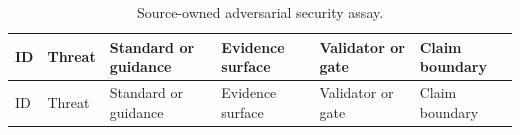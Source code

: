 \documentclass[
  english,
]{article}
\begin{document}
\begin{longtable}[]{@{}
  >{\raggedright\arraybackslash}p{}
  >{\raggedright\arraybackslash}p{}
  >{\raggedright\arraybackslash}p{}
  >{\raggedright\arraybackslash}p{}
  >{\raggedright\arraybackslash}p{}
  >{\raggedright\arraybackslash}p{}@{}}
\caption{Source-owned adversarial security
assay.}\label{tbl:security_assay}\tabularnewline
\toprule\noalign{}
\begin{minipage}[b]{\linewidth}\raggedright
ID
\end{minipage} & \begin{minipage}[b]{\linewidth}\raggedright
Threat
\end{minipage} & \begin{minipage}[b]{\linewidth}\raggedright
Standard or guidance
\end{minipage} & \begin{minipage}[b]{\linewidth}\raggedright
Evidence surface
\end{minipage} & \begin{minipage}[b]{\linewidth}\raggedright
Validator or gate
\end{minipage} & \begin{minipage}[b]{\linewidth}\raggedright
Claim boundary
\end{minipage} \\
\midrule\noalign{}
\endfirsthead
\toprule\noalign{}
\begin{minipage}[b]{\linewidth}\raggedright
ID
\end{minipage} & \begin{minipage}[b]{\linewidth}\raggedright
Threat
\end{minipage} & \begin{minipage}[b]{\linewidth}\raggedright
Standard or guidance
\end{minipage} & \begin{minipage}[b]{\linewidth}\raggedright
Evidence surface
\end{minipage} & \begin{minipage}[b]{\linewidth}\raggedright
Validator or gate
\end{minipage} & \begin{minipage}[b]{\linewidth}\raggedright
Claim boundary
\end{minipage} \\

\end{longtable}
\end{document}
